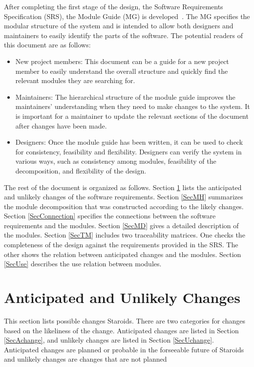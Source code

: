 \documentclass[12pt, titlepage]{article}
\begin{document}
After completing the first stage of the design, the Software Requirements
Specification (SRS), the Module Guide (MG) is developed~\citep{ParnasEtAl1984}. The MG
specifies the modular structure of the system and is intended to allow both
designers and maintainers to easily identify the parts of the software.  The
potential readers of this document are as follows:

\begin{itemize}
\item New project members: This document can be a guide for a new project member
  to easily understand the overall structure and quickly find the
  relevant modules they are searching for.
\item Maintainers: The hierarchical structure of the module guide improves the
  maintainers' understanding when they need to make changes to the system. It is
  important for a maintainer to update the relevant sections of the document
  after changes have been made.
\item Designers: Once the module guide has been written, it can be used to
  check for consistency, feasibility and flexibility. Designers can verify the
  system in various ways, such as consistency among modules, feasibility of the
  decomposition, and flexibility of the design.
\end{itemize}

The rest of the document is organized as follows. Section
\ref{SecChange} lists the anticipated and unlikely changes of the software
requirements. Section \ref{SecMH} summarizes the module decomposition that
was constructed according to the likely changes. Section \ref{SecConnection}
specifies the connections between the software requirements and the
modules. Section \ref{SecMD} gives a detailed description of the
modules. Section \ref{SecTM} includes two traceability matrices. One checks
the completeness of the design against the requirements provided in the SRS. The
other shows the relation between anticipated changes and the modules. Section
\ref{SecUse} describes the use relation between modules.

\section{Anticipated and Unlikely Changes} \label{SecChange}

This section lists possible changes Staroids. There are two categories for changes based on the likeliness of the change. Anticipated changes are listed in Section \ref{SecAchange}, and unlikely changes are listed in Section \ref{SecUchange}. Anticipated changes are planned or probable in the forseeable future of Staroids and unlikely changes are changes that are not planned
\end{document}
